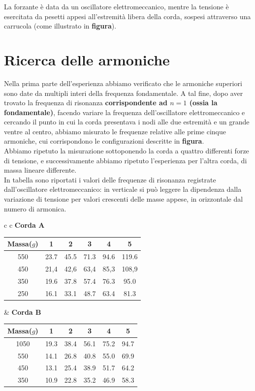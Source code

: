 La forzante è data da un oscillatore elettromeccanico, mentre la tensione è esercitata da pesetti appesi all'estremità libera della corda, sospesi attraverso una carrucola (come illustrato in \textbf{figura}). 
 

\section{Ricerca delle armoniche}

Nella prima parte dell'esperienza abbiamo verificato che le armoniche superiori sono date da multipli interi della frequenza fondamentale. A tal fine, dopo aver trovato la frequenza di risonanza \textbf{corrispondente ad $n=1$ (ossia la fondamentale)}, facendo variare la frequenza dell'oscillatore elettromeccanico e cercando il punto in cui la corda presentava i nodi alle due estremità e un grande ventre al centro, abbiamo misurato le frequenze relative alle prime cinque armoniche, cui corrispondono le configurazioni descritte in \textbf{figura}. 
\\

Abbiamo ripetuto la misurazione sottoponendo la corda a quattro differenti forze di tensione, e successivamente abbiamo ripetuto l'esperienza per l'altra corda, di massa lineare differente. \\
In tabella sono riportati i valori delle frequenze di risonanza registrate dall'oscillatore elettromeccanico: in verticale si può leggere la dipendenza dalla variazione di tensione per valori crescenti delle masse appese, in orizzontale dal numero di armonica.
\\

\begin{center}
\begin{tabular}{c     c}
\textbf{Corda A}
\begin{tabular}{ c | c | c | c | c | c }
Massa($g$) & 1 & 2 & 3 & 4 & 5\\
\midrule
550 & 23.7 & 45.5 & 71.3 & 94.6 & 119.6\\
450 & 21,4 & 42,6 & 63,4 & 85,3 & 108,9\\
350 & 19.6 & 37.8 & 57.4 & 76.3 & 95.0\\
250 & 16.1 & 33.1 & 48.7 & 63.4 & 81.3 \\
\end{tabular}
&
\hspace{2cm}
\textbf{Corda B}
\begin{tabular}{ c | c | c | c | c | c }
Massa($g$) & 1 & 2 & 3 & 4 & 5\\
\midrule
1050 & 19.3 & 38.4 & 56.1 & 75.2 & 94.7 \\
550 & 14.1 & 26.8 & 40.8 & 55.0 & 69.9 \\
450 & 13.1 & 25.4 & 38.9 & 51.7 & 64.2\\
350 & 10.9 & 22.8 & 35.2 & 46.9 & 58.3\\
\end{tabular}

\end{tabular}
\end{center}
